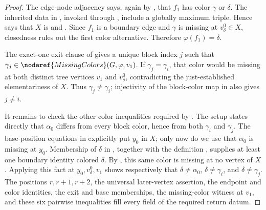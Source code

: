 \begin{proof}
The edge-node adjacency says, again by
, that $f_1$ has color $\gamma$ or
$\delta$.  The inherited data in
, invoked through
, include a globally maximum
triple.  Hence  says that $X$ is
 and
.  Since $f_1$ is a boundary edge
and $\gamma$ is missing at $v^0_\delta\in X$, closedness rules out the
first color alternative.  Therefore $\varphi(f_1)=\delta$.

The exact-one exit clause of 
gives a unique block index $j$ such that
$\gamma_j\in\noderef{MissingColors}(G,\varphi,v_1)$.  If
$\gamma_j=\gamma_i$, that color would be missing at both distinct tree
vertices $v_1$ and $v^0_\delta$, contradicting the just-established
elementariness of $X$.  Thus $\gamma_j\ne\gamma_i$; injectivity of the
block-color map in  also gives
$j\ne i$.

It remains to check the other color inequalities required by
.  The setup states directly that
$\alpha _0$ differs from every block color, hence from both
$\gamma_i$ and $\gamma_j$.  The base-position equations in
 explicitly put $y_0$ in $X$;
only now do we use that $\alpha _0$ is missing at $y_0$.  Membership of
$\delta$ in , together with the definition
, supplies at least one boundary identity
colored $\delta$.  By , this same color
is missing at no vertex of $X$.  Applying this fact at
$y_0,v^0_\delta,v_1$ shows respectively that
$\delta\ne\alpha _0$, $\delta\ne\gamma_i$, and
$\delta\ne\gamma_j$.  The positions $r,r+1,r+2$, the universal
later-vertex assertion, the endpoint and color identities, the exit and
base memberships, the missing-color witness at $v_1$, and these six
pairwise inequalities fill every field of the required return datum.
\end{proof}
